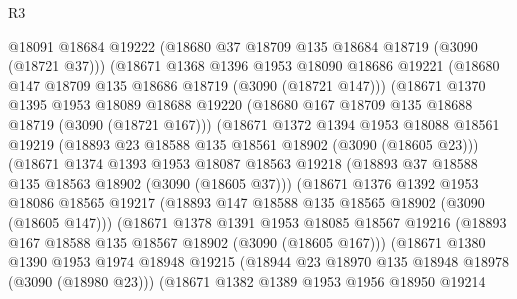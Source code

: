 \begin{lexlean}{R3}
\begin{coremodule}
                  @18091
                  @18684
                  @19222
                  (@18680 @37 @18709 @135 @18684 @18719 (@3090 (@18721 @37)))
                  (@18671
                    @1368
                    @1396
                    @1953
                    @18090
                    @18686
                    @19221
                    (@18680 @147 @18709 @135 @18686 @18719 (@3090 (@18721 @147)))
                    (@18671
                      @1370
                      @1395
                      @1953
                      @18089
                      @18688
                      @19220
                      (@18680 @167 @18709 @135 @18688 @18719 (@3090 (@18721 @167)))
                      (@18671
                        @1372
                        @1394
                        @1953
                        @18088
                        @18561
                        @19219
                        (@18893 @23 @18588 @135 @18561 @18902 (@3090 (@18605 @23)))
                        (@18671
                          @1374
                          @1393
                          @1953
                          @18087
                          @18563
                          @19218
                          (@18893 @37 @18588 @135 @18563 @18902 (@3090 (@18605 @37)))
                          (@18671
                            @1376
                            @1392
                            @1953
                            @18086
                            @18565
                            @19217
                            (@18893 @147 @18588 @135 @18565 @18902 (@3090 (@18605 @147)))
                            (@18671
                              @1378
                              @1391
                              @1953
                              @18085
                              @18567
                              @19216
                              (@18893 @167 @18588 @135 @18567 @18902 (@3090 (@18605 @167)))
                              (@18671
                                @1380
                                @1390
                                @1953
                                @1974
                                @18948
                                @19215
                                (@18944 @23 @18970 @135 @18948 @18978 (@3090 (@18980 @23)))
                                (@18671
                                  @1382
                                  @1389
                                  @1953
                                  @1956
                                  @18950
                                  @19214

\end{coremodule}
\end{lexlean}
